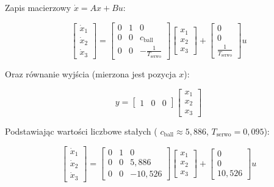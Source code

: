 Zapis macierzowy $\dot{x} = Ax + B u$:

\begin{equation}
\begin{bmatrix} \dot{x}_1 \\ \dot{x}_2 \\ \dot{x}_3 \end{bmatrix} = \begin{bmatrix} 0 & 1 & 0 \\ 0 & 0 & c_{\mathrm{ball}} \\ 0 & 0 & -\frac{1}{T_{\mathrm{serwo}}} \end{bmatrix} \begin{bmatrix} x_1 \\ x_2 \\ x_3 \end{bmatrix} + \begin{bmatrix} 0 \\ 0 \\ \frac{1}{T_{\mathrm{serwo}}} \end{bmatrix} u
\end{equation}

Oraz równanie wyjścia (mierzona jest pozycja $x$):

\begin{equation}
y = \begin{bmatrix} 1 & 0 & 0 \end{bmatrix} \begin{bmatrix} x_1 \\ x_2 \\ x_3 \end{bmatrix}
\end{equation}

Podstawiając wartości liczbowe stałych ( $c_{\mathrm{ball}} \approx 5{,}886$, $T_{\mathrm{serwo}} = 0{,}095$):

\begin{equation}
\begin{bmatrix} \dot{x}_1 \\ \dot{x}_2 \\ \dot{x}_3 \end{bmatrix} = \begin{bmatrix} 0 & 1 & 0 \\ 0 & 0 & 5{,}886 \\ 0 & 0 & -10,526 \end{bmatrix} \begin{bmatrix} x_1 \\ x_2 \\ x_3 \end{bmatrix} + \begin{bmatrix} 0 \\ 0 \\ 10,526 \end{bmatrix} u
\end{equation}

